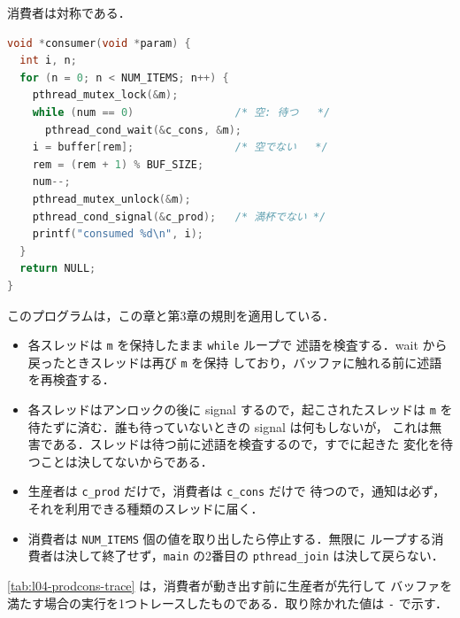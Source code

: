 \documentclass[../main.tex]{subfiles}
\begin{document}
消費者は対称である．
\begin{lstlisting}[language=C, numbers=none]
void *consumer(void *param) {
  int i, n;
  for (n = 0; n < NUM_ITEMS; n++) {
    pthread_mutex_lock(&m);
    while (num == 0)                /* 空: 待つ   */
      pthread_cond_wait(&c_cons, &m);
    i = buffer[rem];                /* 空でない   */
    rem = (rem + 1) % BUF_SIZE;
    num--;
    pthread_mutex_unlock(&m);
    pthread_cond_signal(&c_prod);   /* 満杯でない */
    printf("consumed %d\n", i);
  }
  return NULL;
}
\end{lstlisting}

このプログラムは，この章と第3章の規則を適用している．
\begin{itemize}
  \item 各スレッドは \texttt{m} を保持したまま \texttt{while} ループで
    述語を検査する．wait から戻ったときスレッドは再び \texttt{m} を保持
    しており，バッファに触れる前に述語を再検査する．
  \item 各スレッドはアンロックの後に signal するので，起こされたスレッドは
    \texttt{m} を待たずに済む．誰も待っていないときの signal は何もしないが，
    これは無害である．スレッドは待つ前に述語を検査するので，すでに起きた
    変化を待つことは決してないからである．
  \item 生産者は \texttt{c\_prod} だけで，消費者は \texttt{c\_cons} だけで
    待つので，通知は必ず，それを利用できる種類のスレッドに届く．%
  \item 消費者は \texttt{NUM\_ITEMS} 個の値を取り出したら停止する．無限に
    ループする消費者は決して終了せず，\texttt{main} の2番目の
    \texttt{pthread\_join} は決して戻らない．
\end{itemize}

\begin{example}
  \cref{tab:l04-prodcons-trace} は，消費者が動き出す前に生産者が先行して
  バッファを満たす場合の実行を1つトレースしたものである．取り除かれた値は
  \texttt{-} で示す．
\end{example}
\end{document}
